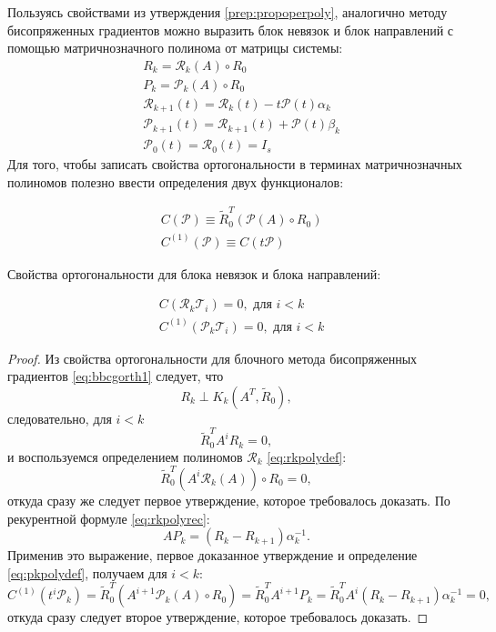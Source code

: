 Пользуясь свойствами из утверждения \ref{prep:propoperpoly}, аналогично методу бисопряженных градиентов можно выразить блок невязок и блок 
направлений с помощью матричнозначного полинома от матрицы системы:
\begin{align}
    &R_k = \mathcal{R}_k (A) \circ R_0 \label{eq:rkpolydef} \\
    &P_k = \mathcal{P}_k (A) \circ R_0 \label{eq:pkpolydef} \\
    &\mathcal{R}_{k+1}(t) = \mathcal{R}_k(t) - t \mathcal{P}(t)\alpha_k \label{eq:rkpolyrec}\\
    &\mathcal{P}_{k+1}(t) = \mathcal{R}_{k+1}(t) + \mathcal{P}(t)\beta_k \label{eq:pkpolyrec}\\
    &\mathcal{P}_0(t) = \mathcal{R}_0(t) = I_s  
\end{align}
Для того, чтобы записать свойства ортогональности в терминах матричнозначных 
полиномов полезно ввести определения двух функционалов:
\begin{definition}
    \begin{align}
        &C(\mathcal{P}) \equiv \tilde{R}_0^T (\mathcal{P}(A) \circ R_0) \\
        &C^{(1)}(\mathcal{P}) \equiv C(t\mathcal{P})
    \end{align}
\end{definition} 
Свойства ортогональности для блока невязок и блока направлений:
\begin{preposition}
    \label{prep:orthbcgstab}
    \begin{align}
        &C(\mathcal{R}_k \mathcal{T}_i) = 0, \text{ для $i < k$} \\
        &C^{(1)}(\mathcal{P}_k \mathcal{T}_i) = 0, \text{ для $i < k$}
    \end{align}
\end{preposition}
\begin{proof}
    Из свойства ортогональности для блочного метода бисопряженных градиентов \eqref{eq:bbcgorth1}
    следует, что
    $$R_k \perp K_k(A^T,\tilde{R}_0),$$
    следовательно, для $i < k$ 
    $$\tilde{R}_0^T A^i R_k = 0,$$
    и воспользуемся определением полиномов $\mathcal{R}_{k}$ \eqref{eq:rkpolydef}:
    $$\tilde{R}_0^T (A^i \mathcal{R}_k(A)) \circ R_0 = 0,$$
    откуда сразу же следует первое утверждение, которое требовалось доказать.
    По рекурентной формуле \eqref{eq:rkpolyrec}:
    $$AP_k=(R_k - R_{k+1})\alpha_k^{-1}.$$
    Применив это выражение, первое доказанное утверждение и определение \eqref{eq:pkpolydef}, получаем для $i < k$:
    $$C^{(1)}(t^{i}\mathcal{P}_k) = \tilde{R}_0^T (A^{i+1}\mathcal{P}_k(A) \circ R_0) = \tilde{R}_0^T A^{i+1} P_k = \tilde{R}_0^T A^i (R_k - R_{k+1})\alpha_k^{-1} = 0,$$
    откуда сразу следует второе утверждение, которое требовалось доказать.
\end{proof}
